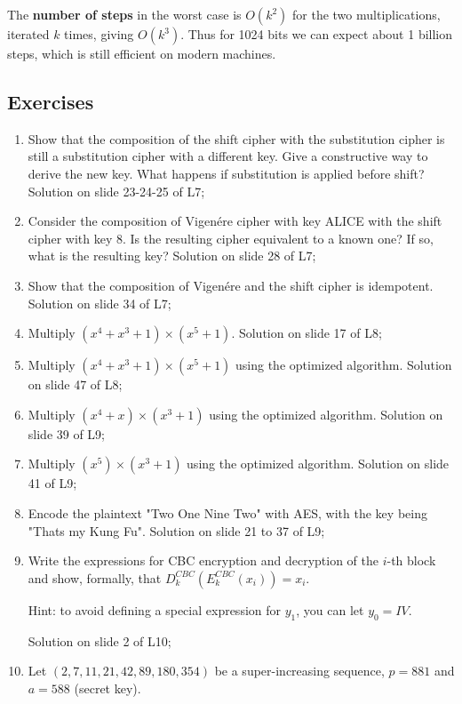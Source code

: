 The \textbf{number of steps} in the worst case is $O(k^2)$ for the two multiplications, iterated $k$ times, giving $O(k^3)$. Thus for 1024 bits we can expect about 1 billion steps, which is still efficient on modern machines.

\newpage
\subsection{Exercises}
\begin{enumerate}
    \item Show that the composition of the shift cipher with the substitution cipher is still a substitution cipher with a different key. Give a constructive way to derive the new key. What happens if substitution is applied before shift? Solution on slide 23-24-25 of L7;
    \item Consider the composition of Vigenére cipher with key ALICE with the shift cipher with key 8. Is the resulting cipher equivalent to a known one? If so, what is the resulting key? Solution on slide 28 of L7;
    \item Show that the composition of Vigenére and the shift cipher is idempotent. Solution on slide 34 of L7;
    \item Multiply $(x^4 + x^3 + 1) \times (x^5 + 1)$. Solution on slide 17 of L8;
    \item Multiply $(x^4 + x^3 + 1) \times (x^5 + 1)$ using the optimized algorithm. Solution on slide 47 of L8;
    \item Multiply $(x^4 + x) \times (x^3 + 1)$ using the optimized algorithm. Solution on slide 39 of L9;
    \item Multiply $(x^5) \times (x^3 + 1)$ using the optimized algorithm. Solution on slide 41 of L9;
    \item Encode the plaintext "Two One Nine Two" with AES, with the key being "Thats my Kung Fu". Solution on slide 21 to 37 of L9;
    \item Write the expressions for CBC encryption and decryption of the $i$-th block and show, formally, that $D^{CBC}_k(E^{CBC}_k(x_i)) = x_i$.
    
    Hint: to avoid defining a special expression for $y_1$, you can let $y_0 = IV$.

    Solution on slide 2 of L10;

    \item Let $(2, 7, 11, 21, 42, 89, 180, 354)$ be a super-increasing sequence, $p=881$ and $a=588$ (secret key). 
    

\end{enumerate}
